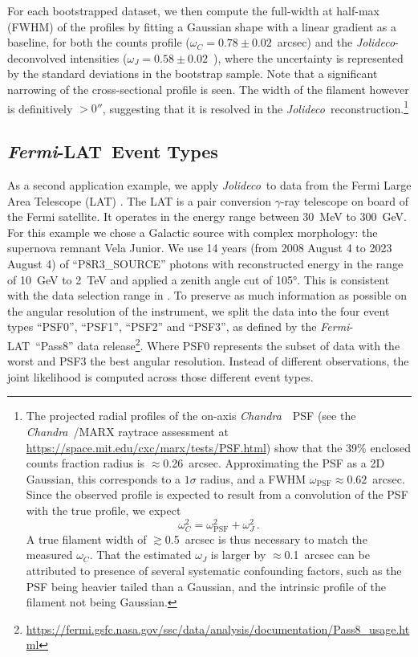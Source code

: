 \documentclass[twocolumn, linenumbers]{aastex631}
\newcommand{\chandra}{\textit{Chandra}~}
\newcommand{\fermi}{\textit{Fermi}-LAT~}
\newcommand{\jolideco}{\textit{Jolideco}~}
\newcommand{\jolideconospace}{\textit{Jolideco}}
\newcommand{\gammaray}{$\gamma$-ray\xspace}
\begin{document}
    For each bootstrapped dataset, we then compute the full-width at half-max (FWHM) of the profiles by fitting a Gaussian shape with a linear gradient as a baseline, for both the counts profile ($\omega_C=0.78{\pm}0.02$~arcsec) and the \jolideconospace-deconvolved intensities ($\omega_J=0.58{\pm}0.02$~\arcsec), where the uncertainty is represented by the standard deviations in the bootstrap sample.  Note that a significant narrowing of the cross-sectional profile is seen.  The width of the filament however is definitively $>0''$, suggesting that it is resolved in the \jolideconospace\ reconstruction.\footnote{The projected radial profiles of the on-axis \chandra\ PSF (see the \chandra/MARX raytrace assessment at \url{https://space.mit.edu/cxc/marx/tests/PSF.html}) show that the 39\% enclosed counts fraction radius is $\approx$0.26~arcsec.  Approximating the PSF as a 2D Gaussian, this corresponds to a $1\sigma$ radius, and a FWHM $\omega_{\textrm{PSF}}{\approx}0.62$~arcsec.  Since the observed profile is expected to result from a convolution of the PSF with the true profile, we expect
    $$\omega_C^2 = \omega_{\textrm{PSF}}^2+\omega_J^2 \,.$$  
    A true filament width of $\gtrsim$0.5~arcsec is thus necessary to match the measured $\omega_C$.  That the estimated $\omega_J$ is larger by $\approx$0.1~arcsec can be attributed to presence of several systematic confounding factors, such as the PSF being heavier tailed than a Gaussian, and the intrinsic profile of the filament not being Gaussian.}
    
    \subsection{\fermi Event Types}
    \label{sec:fermi-lat-example}
     As a second application example, we apply \jolideco  to data from the Fermi Large Area Telescope (LAT) \citep{Atwood2009}. The LAT is a pair conversion \gammaray telescope on board of the Fermi satellite. It operates in the energy range between \qty[mode = text]{30}{MeV} to  \qty[mode = text]{300}{GeV}. For this example we chose  a Galactic source with complex morphology: the supernova remnant Vela Junior. We use 14 years (from 2008 August 4 to 2023 August 4) of \enquote{P8R3\_SOURCE} photons with reconstructed energy in the range of \qty[mode = text]{10}{GeV} to \qty[mode = text]{2}{TeV} and applied a zenith angle cut of \ang{105}. This is consistent with the data selection range in \cite{Ackermann2017}. To preserve as much information as possible on the angular resolution of the instrument, we split the data into the four event types \enquote{PSF0}, \enquote{PSF1}, \enquote{PSF2} and \enquote{PSF3}, as defined by the \fermi \enquote{Pass8} data release\footnote{\url{https://fermi.gsfc.nasa.gov/ssc/data/analysis/documentation/Pass8_usage.html}}. Where PSF0 represents the subset of data with the worst and PSF3 the best angular resolution. Instead of different observations, the joint likelihood is computed across those different event types.
     
\end{document}
